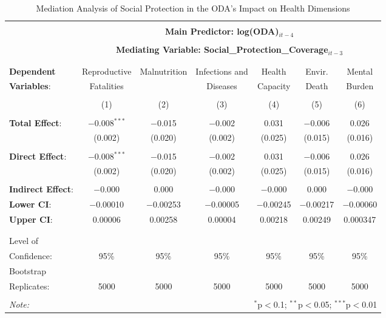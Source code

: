 \renewcommand{\arraystretch}{0.7} %
\begin{table}[!htbp] \centering 
  \caption{Mediation Analysis of Social Protection in the ODA's Impact on Health Dimensions} 
  \label{tab:MediationModel} 
\begin{tabular}{@{\extracolsep{-3pt}}lcccccc} 
\\[-1.8ex]\hline 
\hline \\[-1.8ex] 
 & \multicolumn{6}{c}{\textbf{Main Predictor: log(ODA)$_{it-4}$}} \\
 & & & & & & \\ 
 & \multicolumn{6}{c}{\textbf{Mediating Variable: Social\_Protection\_Coverage$_{it-3}$}} \\
\cline{2-7} 
\\[-1.8ex] & \multicolumn{6}{c}{ } \\ 
\textbf{Dependent} & Reproductive & Malnutrition  & Infections and & Health & Envir. & Mental\\
\textbf{Variables}: & Fatalities & & Diseases & Capacity & Death & Burden \\
\\[-1.8ex] & (1) & (2) & (3) & (4) & (5) & (6)\\ 
\hline \\[-1.8ex] 
\textbf{Total Effect}: & $-$0.008$^{***}$ & $-$0.015 &$-$0.002 & 0.031 & $-$0.006 & 0.026 \\
 & (0.002)& (0.020)& (0.002)& (0.025) & (0.015)& (0.016)\\
 & & & & & & \\ 
 \textbf{Direct Effect}: & $-$0.008$^{***}$ & $-$0.015 & $-$0.002 & 0.031 & $-$0.006 & 0.026\\
 & (0.002) & (0.020) & (0.002) & (0.025) & (0.015)&  (0.016)\\
 & & & & & & \\  
 \textbf{Indirect Effect}: & $-$0.000 & 0.000 & $-$0.000 & $-$0.000 & 0.000 & $-$0.000\\
 \textbf{Lower CI}: & $-$0.00010 &$-$0.00253 &  $-$0.00005 & $-$0.00245  &  $-$0.00217 & $-$0.00060\\ 
\textbf{Upper CI}: & 0.00006 & 0.00258 & 0.00004 & 0.00218 & 0.00249 & 0.000347 \\
 & & & & & & \\ 
\hline \\[-1.8ex] 
Level of & & & & & & \\
Confidence: & 95\% & 95\% & 95\% & 95\% & 95\% & 95\%\\
Bootstrap &&&&&& \\
Replicates: & 5000 & 5000 & 5000 & 5000 & 5000 & 5000\\
\bottomrule
\hline \\[-1.8ex] 
\textit{Note:}  & \multicolumn{6}{r}{$^{*}$p$<$0.1; $^{**}$p$<$0.05; $^{***}$p$<$0.01} \\ 
\end{tabular} 
\end{table} 


